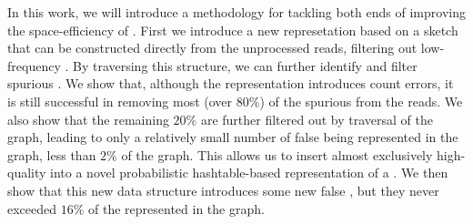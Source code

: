 
In this work, we will introduce a methodology for tackling both ends of improving the space-efficiency of \dBG. First we introduce a new represetation based on a \cm sketch \cite{Cormode2005} that can be constructed directly from the unprocessed reads, filtering out low-frequency . By traversing this structure, we can further identify and filter spurious . We show that, although the  representation introduces count errors, it is still successful in removing most (over $80\%$) of the spurious  from the reads. We also show that the remaining $20\%$ are further filtered out by traversal of the graph, leading to only a relatively small number of false  being represented in the graph, less than $2\%$ of the graph. This allows us to insert almost exclusively high-quality  into a novel probabilistic hashtable-based representation of a \dBG. We then show that this new data structure introduces some new false , but they never exceeded $16\%$ of the  represented in the graph.